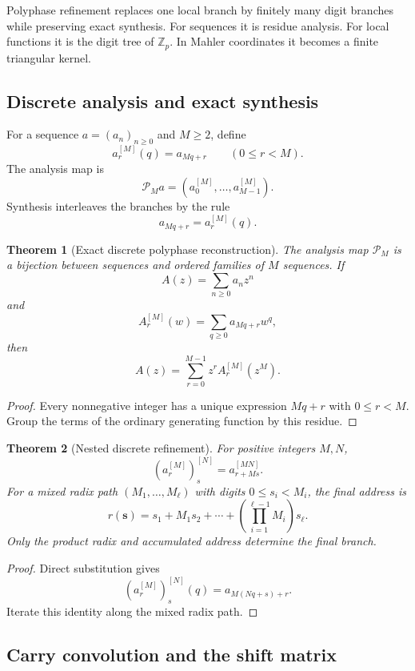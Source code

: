 \documentclass{aomart}
\newtheorem{theorem}{Theorem}[section]
\theoremstyle{definition}
\theoremstyle{remark}
\begin{document}
Polyphase refinement replaces one local branch by finitely many digit branches while preserving exact synthesis. For sequences it is residue analysis. For local functions it is the digit tree of \(\mathbb Z_p\). In Mahler coordinates it becomes a finite triangular kernel.

\subsection{Discrete analysis and exact synthesis}

For a sequence \(a=(a_n)_{n\geq0}\) and \(M\geq2\), define
\[
a_r^{[M]}(q)=a_{Mq+r}
\qquad(0\leq r<M).
\]
The analysis map is
\[
\mathcal P_Ma
=
\left(a_0^{[M]},\ldots,a_{M-1}^{[M]}\right).
\]
Synthesis interleaves the branches by the rule
\[
a_{Mq+r}=a_r^{[M]}(q).
\]

\begin{theorem}[Exact discrete polyphase reconstruction]\label{thm:discrete_polyphase_reconstruction}
The analysis map \(\mathcal P_M\) is a bijection between sequences and ordered families of \(M\) sequences. If
\[
A(z)=\sum_{n\geq0}a_nz^n
\]
and
\[
A_r^{[M]}(w)=\sum_{q\geq0}a_{Mq+r}w^q,
\]
then
\[
\boxed{
A(z)=\sum_{r=0}^{M-1}z^rA_r^{[M]}(z^M).
}
\]
\end{theorem}

\begin{proof}
Every nonnegative integer has a unique expression \(Mq+r\) with \(0\leq r<M\). Group the terms of the ordinary generating function by this residue.
\end{proof}

\begin{theorem}[Nested discrete refinement]\label{thm:nested_discrete_polyphase}
For positive integers \(M,N\),
\[
\boxed{
\left(a_r^{[M]}\right)_s^{[N]}
=
a_{r+Ms}^{[MN]}.
}
\]
For a mixed radix path \((M_1,\ldots,M_\ell)\) with digits \(0\leq s_i<M_i\), the final address is
\[
\boxed{
r(\boldsymbol s)
=
s_1+M_1s_2+\cdots+
\left(\prod_{i=1}^{\ell-1}M_i\right)s_\ell.
}
\]
Only the product radix and accumulated address determine the final branch.
\end{theorem}

\begin{proof}
Direct substitution gives
\[
\left(a_r^{[M]}\right)_s^{[N]}(q)
=
a_{M(Nq+s)+r}.
\]
Iterate this identity along the mixed radix path.
\end{proof}

\subsection{Carry convolution and the shift matrix}
\end{document}
